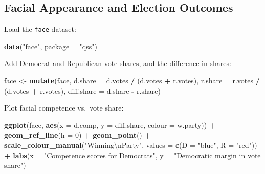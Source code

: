 \documentclass[]{book}
\newenvironment{Shaded}{\begin{snugshade}}{\end{snugshade}}
\newcommand{\CharTok}[1]{\textcolor[rgb]{0.31,0.60,0.02}{#1}}
\newcommand{\DataTypeTok}[1]{\textcolor[rgb]{0.13,0.29,0.53}{#1}}
\newcommand{\DecValTok}[1]{\textcolor[rgb]{0.00,0.00,0.81}{#1}}
\newcommand{\KeywordTok}[1]{\textcolor[rgb]{0.13,0.29,0.53}{\textbf{#1}}}
\newcommand{\NormalTok}[1]{#1}
\newcommand{\OperatorTok}[1]{\textcolor[rgb]{0.81,0.36,0.00}{\textbf{#1}}}
\newcommand{\StringTok}[1]{\textcolor[rgb]{0.31,0.60,0.02}{#1}}
\theoremstyle{definition}
\theoremstyle{definition}
\theoremstyle{definition}
\theoremstyle{remark}
\begin{document}
\hypertarget{facial-appearance-and-election-outcomes}{%
\subsection{Facial Appearance and Election
Outcomes}\label{facial-appearance-and-election-outcomes}}

Load the \texttt{face} dataset:

\begin{Shaded}
\begin{Highlighting}[]
\KeywordTok{data}\NormalTok{(}\StringTok{"face"}\NormalTok{, }\DataTypeTok{package =} \StringTok{"qss"}\NormalTok{)}
\end{Highlighting}
\end{Shaded}

Add Democrat and Republican vote shares, and the difference in shares:

\begin{Shaded}
\begin{Highlighting}[]
\NormalTok{face <-}\StringTok{ }\KeywordTok{mutate}\NormalTok{(face,}
                \DataTypeTok{d.share =}\NormalTok{ d.votes }\OperatorTok{/}\StringTok{ }\NormalTok{(d.votes }\OperatorTok{+}\StringTok{ }\NormalTok{r.votes),}
                \DataTypeTok{r.share =}\NormalTok{ r.votes }\OperatorTok{/}\StringTok{ }\NormalTok{(d.votes }\OperatorTok{+}\StringTok{ }\NormalTok{r.votes),}
                \DataTypeTok{diff.share =}\NormalTok{ d.share }\OperatorTok{-}\StringTok{ }\NormalTok{r.share)}
\end{Highlighting}
\end{Shaded}

Plot facial competence vs.~vote share:

\begin{Shaded}
\begin{Highlighting}[]
\KeywordTok{ggplot}\NormalTok{(face, }\KeywordTok{aes}\NormalTok{(}\DataTypeTok{x =}\NormalTok{ d.comp, }\DataTypeTok{y =}\NormalTok{ diff.share, }\DataTypeTok{colour =}\NormalTok{ w.party)) }\OperatorTok{+}
\StringTok{  }\KeywordTok{geom_ref_line}\NormalTok{(}\DataTypeTok{h =} \DecValTok{0}\NormalTok{) }\OperatorTok{+}
\StringTok{  }\KeywordTok{geom_point}\NormalTok{() }\OperatorTok{+}
\StringTok{  }\KeywordTok{scale_colour_manual}\NormalTok{(}\StringTok{"Winning}\CharTok{\textbackslash{}n}\StringTok{Party"}\NormalTok{,}
                      \DataTypeTok{values =} \KeywordTok{c}\NormalTok{(}\DataTypeTok{D =} \StringTok{"blue"}\NormalTok{, }\DataTypeTok{R =} \StringTok{"red"}\NormalTok{)) }\OperatorTok{+}
\StringTok{  }\KeywordTok{labs}\NormalTok{(}\DataTypeTok{x =} \StringTok{"Competence scores for Democrats"}\NormalTok{,}
       \DataTypeTok{y =} \StringTok{"Democratic margin in vote share"}\NormalTok{)}
\end{Highlighting}
\end{Shaded}
\end{document}
